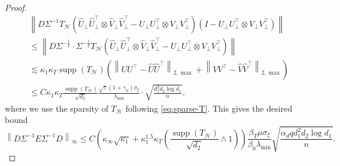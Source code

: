 \documentclass[12pt]{article}
\newcommand{\norm}[1]{\left\lVert#1\right\rVert}
\def\calH{{\mathcal H}}
\theoremstyle{plain}
\begin{document}
\begin{proof}
\begin{equation*}
    \begin{aligned}
      &\norm{D\Sigma^{-1}T_{\calH}\left(\widehat U_\perp \widehat U_\perp^\top \otimes \widehat V_\perp \widehat V_\perp^\top - U_\perp U_\perp^\top \otimes V_\perp V_\perp^\top\right) \left(I-U_\perp U_\perp^\top \otimes V_\perp V_\perp^\top\right)}  \\
      & \le \norm{D\Sigma^{-\frac{1}{2} }\cdot \Sigma^{-\frac{1}{2} }T_{\calH}\left(\widehat U_\perp \widehat U_\perp^\top \otimes \widehat V_\perp \widehat V_\perp^\top - U_\perp U_\perp^\top \otimes V_\perp V_\perp^\top\right)}\\
          &  \lesssim {\kappa_1}\kappa_T\operatorname{supp}(T_{\calH} )  \left(\norm{UU^\top-\widehat{U}\widehat{U}^\top }_{2,\max} + \norm{VV^\top-\widehat{V}\widehat{V}^\top }_{2,\max} \right)  \\
          & \le C \kappa_1\kappa_T\frac{\operatorname{supp}(T_{\calH} )}{\sqrt{d_2}} \frac{\sqrt{\tau}\left(1+\gamma_{n}\right) \sigma_{\xi}}{\lambda_{\min}} \cdot \sqrt{\frac{d_1^2 d_2 \log d_1}{n}},
    \end{aligned}
\end{equation*}
where we use the sparsity of $T_{\calH}$ following \eqref{eq:sparse-T}. This gives the desired bound 
\begin{equation*}
    \norm{{D}{\Sigma}^{-1}E{\Sigma}^{-1}{D}}_\infty \le C\left(\kappa_\infty\sqrt{\kappa_1} +\kappa_1^{1.5}\kappa_T\left( \frac{\operatorname{supp}(T_{\calH} )}{\sqrt{d_2}}\wedge 1 \right)  \right)\frac{\beta_T \mu \sigma_\xi }{\beta_0 \lambda_{\min} }\sqrt{\frac{\alpha_d q d_1^2 d_2 \log d_1 }{n}}.
\end{equation*}

\end{proof}
\end{document}
